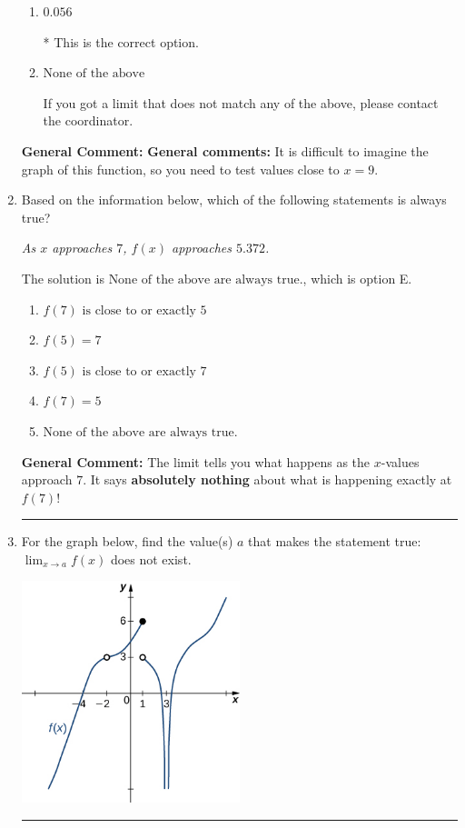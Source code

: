 \documentclass{extbook}[14pt]
\newcommand{\litem}[1]{\item #1

\rule{\textwidth}{0.4pt}}
\begin{document}
\begin{enumerate}
{\begin{enumerate}[label=\Alph*.]
You likely tried to use a shortcut to find the limit of a function that only works for when the numerator/denominator are polynomials.
\item \( 0.056 \)

* This is the correct option.
\item \( \text{None of the above} \)

If you got a limit that does not match any of the above, please contact the coordinator.
\end{enumerate}

\textbf{General Comment:} \textbf{General comments:} It is difficult to imagine the graph of this function, so you need to test values close to $x = 9$.
}
\litem{
Based on the information below, which of the following statements is always true?

\begin{center}
    \textit{ As $x$ approaches $7$, $f(x)$ approaches $5.372$. }
\end{center}
The solution is \( \text{None of the above are always true.} \), which is option E.\begin{enumerate}[label=\Alph*.]
\item \( f(7) \text{ is close to or exactly } 5 \)


\item \( f(5) = 7 \)


\item \( f(5) \text{ is close to or exactly } 7 \)


\item \( f(7) = 5 \)


\item \( \text{None of the above are always true.} \)


\end{enumerate}

\textbf{General Comment:} The limit tells you what happens as the $x$-values approach $7$. It says \textbf{absolutely nothing} about what is happening exactly at $f(7)$!
}
\litem{
For the graph below, find the value(s) $a$ that makes the statement true: $ \displaystyle \lim_{x \rightarrow a} f(x)$ does not exist.

\begin{center}
    \includegraphics[width=0.5\textwidth]{../Figures/evaluateLimitGraphicallyC.png}
\end{center}


}
\end{enumerate}
\end{document}
